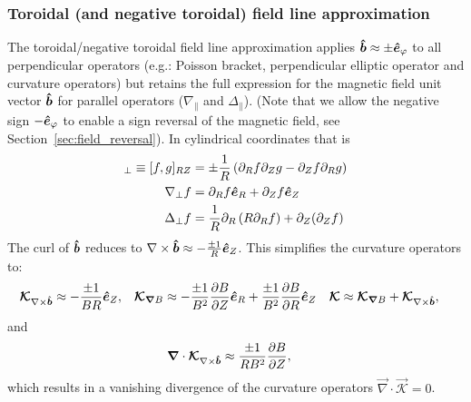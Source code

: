 \subsubsection{Toroidal (and negative toroidal) field line approximation}\label{sec:torfieldlineapprox}
The toroidal/negative toroidal field line approximation applies \(\bm{\hat{b}}\approx \pm \bm{\hat{e}}_\varphi\) to all perpendicular operators
(e.g.: Poisson bracket, perpendicular elliptic operator and curvature operators)
but retains the full expression for the magnetic field unit vector \(\bm{\hat{b}}\)
for parallel operators (\(\nabla_\parallel\) and \(\Delta_\parallel\)).
(Note that we allow the negative sign $-\bm{\hat{e}}_\varphi$ to enable a sign reversal of the magnetic field, see Section~\ref{sec:field_reversal}).
In cylindrical coordinates that is
\begin{align}
[f,g]_\perp \equiv [f,g]_{RZ} &= \pm\frac{1}{R} \left(\partial_R f\partial_Z g - \partial_Z f\partial_R g\right) \\
\nabla_\perp f &= \partial_R f \ehat_R + \partial_Z f \ehat_Z \\
\Delta_\perp f &= \frac{1}{R}\partial_R \left( R \partial_R f\right) + \partial_Z(\partial_Z f)
\label{}
\end{align}
The curl of $\bm{\hat{b}}$ reduces to
 $\nabla\times\bm{\hat{b}} \approx -  \frac{\pm 1}{R} \bm{\hat{e}}_Z$.
This simplifies the curvature operators to:
\begin{align}
{\boldsymbol{\mathcal{K}}}_{{\nabla\times\bm{\hat{b}}}}  &\approx  -  \frac{\pm 1}{B R} \bm{\hat{e}}_Z , &
{\boldsymbol{ \mathcal{K} }}_{{\boldsymbol{\nabla}}  B}  &\approx  -\frac{\pm 1}{B^2}\frac{\partial B}{\partial Z}\bm{\hat{e}}_R +\frac{\pm 1}{B^2} \frac{\partial B}{\partial R}\bm{\hat{e}}_Z &
{\boldsymbol{ \mathcal{K} }} &\approx {\boldsymbol{ \mathcal{K} }}_{{\boldsymbol{\nabla}}  B}  +{\boldsymbol{ \mathcal{K} }}_{{\nabla\times\bm{\hat{b}}}} ,
\end{align}
and
\begin{align}
 {\boldsymbol{\nabla}} \cdot {\boldsymbol{\mathcal{K}}}_{{\nabla\times\bm{\hat{b}}}} &\approx \frac{\pm 1}{R B^2} \frac{\partial B}{\partial Z},
\end{align}
which results in a vanishing divergence of the curvature operators \( \vec{\nabla} \cdot \vec{ \mathcal{K} } = 0\).

